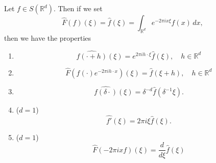 \begin{proposition}
	Let \( f \in S(\mathbb{R}^{d}) \). Then if we set
	\[ \hat F(f)( \xi) = \hat f( \xi) = \int_{\mathbb{R}^{d}} e^{-2 \pi i x \xi} f(x) \, dx, \]
	then we have the properties
	\begin{enumerate}
	
		\item \[ \widehat{f( \cdot + h)}( \xi) = e^{2 \pi i h \cdot \xi} \hat f( \xi), \quad h \in \mathbb{R}^{d} \]
		\item 
			\[ \hat F(f( \cdot) e^{- 2 \pi i h \cdot x})( \xi) = \hat f( \xi + h), \quad h \in \mathbb{R}^{d} \]
		\item 
			\[ \widehat{f(\delta \cdot)}( \xi) = \delta^{- d} \hat f( \delta^{-1} \xi). \]
		\item (\( d = 1 \)) 
			\[ \widehat{f'}( \xi) = 2 \pi i \xi \hat f( \xi). \]
		\item (\( d = 1 \))
			\[ \hat F( - 2 \pi i x f)( \xi) = \frac{d}{d \xi}\hat f(\xi) \]

	
	\end{enumerate}
\end{proposition}

